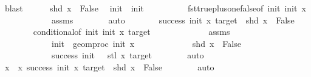 \begin{isabellebody}
\ blast\isanewline
\ \ \ \ \isamarkupfalse%
\ {\isacartoucheopen}shd\ x\ {\isacharequal}{\kern0pt}\ False{\isacartoucheclose}\ \isamarkupfalse%
\ {\isachardoublequoteopen}init{\isacharprime}{\kern0pt}\ {\isacharequal}{\kern0pt}\ init\ {\isacharminus}{\kern0pt}\ {}{\isachardoublequoteclose}\isanewline
\ \ \ \ \ \ \isamarkupfalse%
\ fst{\isacharunderscore}{\kern0pt}true{\isacharunderscore}{\kern0pt}plus{\isacharunderscore}{\kern0pt}one{\isacharunderscore}{\kern0pt}false{\isacharbrackleft}{\kern0pt}of\ init{\isacharprime}{\kern0pt}\ init\ x{\isacharbrackright}{\kern0pt}\isanewline
\ \ \ \ \ \ \ \ \ \ \ \ assms{\isacharparenleft}{\kern0pt}{}{\isacharparenright}{\kern0pt}\isanewline
\ \ \ \ \ \ \isamarkupfalse%
\ auto\isanewline
\ \ \ \ \isamarkupfalse%
\ \isamarkupfalse%
\ {\isachardoublequoteopen}success\ init\ x\ target\ {\isasymand}\ shd\ x\ {\isacharequal}{\kern0pt}\ False{\isachardoublequoteclose}\isanewline
\ \ \ \ \ \ \isamarkupfalse%
\ conditional{}{\isacharbrackleft}{\kern0pt}of\ init{\isacharprime}{\kern0pt}\ init\ x\ target{\isacharbrackright}{\kern0pt}\ \isanewline
\ \ \ \ \ \ \ \ \ \ \ \ assms\isanewline
\ \ \ \ \ \ \ \ \ \ \ \ {\isacartoucheopen}init{\isacharprime}{\kern0pt}\ {\isacharequal}{\kern0pt}\ geom{\isacharunderscore}{\kern0pt}proc\ init\ x\ {}{\isacartoucheclose}\isanewline
\ \ \ \ \ \ \ \ \ \ \ \ {\isacartoucheopen}shd\ x\ {\isacharequal}{\kern0pt}\ False{\isacartoucheclose}\isanewline
\ \ \ \ \ \ \ \ \ \ \ \ {\isacartoucheopen}success\ {\isacharparenleft}{\kern0pt}init\ {\isacharminus}{\kern0pt}\ {}{\isacharparenright}{\kern0pt}\ {\isacharparenleft}{\kern0pt}stl\ x{\isacharparenright}{\kern0pt}\ target{\isacartoucheclose}\isanewline
\ \ \ \ \ \ \isamarkupfalse%
\ auto\isanewline
\ \ \ \ \isamarkupfalse%
\ \isamarkupfalse%
\ {\isachardoublequoteopen}x\ {\isasymin}\ {\isacharbraceleft}{\kern0pt}x{\isachardot}{\kern0pt}\ success\ init\ x\ target\ {\isasymand}\ shd\ x\ {\isacharequal}{\kern0pt}\ False{\isacharbraceright}{\kern0pt}{\isachardoublequoteclose}\isanewline
\ \ \ \ \ \ \isamarkupfalse%
\ auto\isanewline
\ \ \isamarkupfalse%
\isanewline
{}\isamarkupfalse%
%
\endisatagproof
{\isafoldproof}%
%
\isadelimproof
%
\endisadelimproof
%
\isadelimdocument
%
\endisadelimdocument
%
\isatagdocument
%
\isamarkuptrue%
%
\endisatagdocument

\end{isabellebody}

